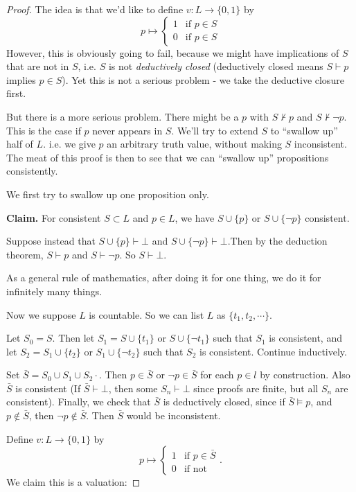 \documentclass[a4paper]{article}
\begin{document}
\begin{proof}
  The idea is that we'd like to define $v: L \to \{0, 1\}$ by
  \[
    p\mapsto
    \begin{cases}
      1 & \text{if } p\in S\\
      0 & \text{if } p\in S
    \end{cases}
  \]
  However, this is obviously going to fail, because we might have implications of $S$ that are not in $S$, i.e. $S$ is not \emph{deductively closed} (deductively closed means $S\vdash p$ implies $p\in S$). Yet this is not a serious problem - we take the deductive closure first.

  But there is a more serious problem. There might be a $p$ with $S\not\vdash p$ and $S\not\vdash \neg p$. This is the case if $p$ never appears in $S$. We'll try to extend $S$ to ``swallow up'' half of $L$. i.e. we give $p$ an arbitrary truth value, without making $S$ inconsistent. The meat of this proof is then to see that we can ``swallow up'' propositions consistently.

  We first try to swallow up one proposition only.
  
  \noindent\textbf{Claim.} For consistent $S\subset L$ and $p\in L$, we have $S\cup \{p\}$ or $S\cup \{\neg p\}$ consistent.

  Suppose instead that $S\cup \{p\} \vdash \bot$ and $S\cup \{\neg p\}\vdash \bot$.Then by the deduction theorem, $S\vdash p$ and $S\vdash \neg p$. So $S\vdash \bot$.

  As a general rule of mathematics, after doing it for one thing, we do it for infinitely many things.

  Now we suppose $L$ is countable. So we can list $L$ as $\{t_1, t_2, \cdots\}$.

  Let $S_0 = S$. Then let $S_1 = S\cup \{t_1\}$ or $S\cup \{\neg t_1\}$ such that $S_1$ is consistent, and let $S_2 = S_1 \cup \{t_2\}$ or $S_1\cup \{\neg t_2\}$ such that $S_2$ is consistent. Continue inductively.

  Set $\bar{S} = S_0\cup S_1\cup S_2\cdot$. Then $p\in \bar{S}$ or $\neg p\in \bar{S}$ for each $p\in l$ by construction. Also $\bar S$ is consistent (If $\bar S\vdash \bot$, then some $S_n\vdash \bot$ since proofs are finite, but all $S_n$ are consistent). Finally, we check that $\bar S$ is deductively closed, since if $\bar S\models p$, and $p\not\in \bar S$, then $\neg p\not\in \bar S$. Then $\bar S$ would be inconsistent.

  Define $v: L\to \{0, 1\}$ by
  \[
    p \mapsto
    \begin{cases}
      1 & \text{if }p\in \bar S\\
      0 & \text{if not}
    \end{cases}.
  \]
  We claim this is a valuation:


\end{proof}
\end{document}
